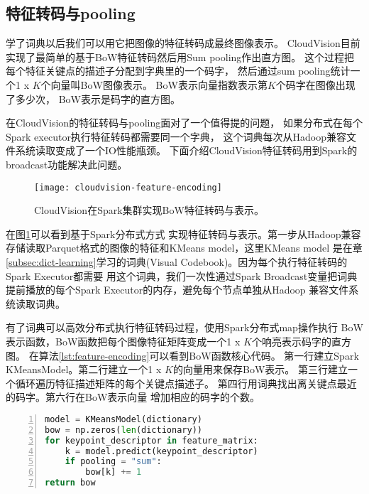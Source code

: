 \subsection{特征转码与pooling}
\label{subsec:feature-encoding}
学了词典以后我们可以用它把图像的特征转码成最终图像表示。
CloudVision目前实现了最简单的基于BoW特征转码然后用Sum pooling作出直方图。
这个过程把每个特征关键点的描述子分配到字典里的一个码字，
然后通过sum pooling统计一个1 x $K$个向量叫BoW图像表示。
BoW表示向量指数表示第$K$个码字在图像出现了多少次，
BoW表示是码字的直方图。

在CloudVision的特征转码与pooling面对了一个值得提的问题，
如果分布式在每个Spark executor执行特征转码都需要同一个字典，
这个词典每次从Hadoop兼容文件系统读取变成了一个IO性能瓶颈。
下面介绍CloudVision特征转码用到Spark的broadcast功能解决此问题。


\begin{figure}[h]
  \centering
    \texttt{[image: cloudvision-feature-encoding]}
  \caption{CloudVision在Spark集群实现BoW特征转码与表示。}
  \label{fig:cloudvision-feature-encoding}
\end{figure}
在图\ref{fig:cloudvision-feature-encoding}可以看到基于Spark分布式方式
实现特征转码与表示。第一步从Hadoop兼容存储读取Parquet格式的图像的特征和KMeans model，这里KMeans model
是在章\ref{subsec:dict-learning}学习的词典(Visual Codebook)。因为每个执行特征转码的Spark Executor都需要
用这个词典，我们一次性通过Spark Broadcast变量把词典提前播放的每个Spark Executor的内存，避免每个节点单独从Hadoop
兼容文件系统读取词典。\cite{spark-programming-guide}

有了词典可以高效分布式执行特征转码过程，使用Spark分布式map操作执行
BoW表示函数，BoW函数把每个图像特征矩阵变成一个1 x $K$个响亮表示码字的直方图。
在算法\ref{lst:feature-encoding}可以看到BoW函数核心代码。
第一行建立Spark KMeansModel。第二行建立一个1 x $K$的向量用来保存BoW表示。
第三行建立一个循环遍历特征描述矩阵的每个关键点描述子。
第四行用词典找出离关键点最近的码字。第六行在BoW表示向量
增加相应的码字的个数。
\begin{lstlisting}[language=Python,
                   basicstyle=\small,
                   numbers=left,
                   showstringspaces=false,
                   caption={BoW特征转码核心代码},
                   label={lst:feature-encoding}]
model = KMeansModel(dictionary)
bow = np.zeros(len(dictionary))
for keypoint_descriptor in feature_matrix:
    k = model.predict(keypoint_descriptor)
    if pooling = "sum":
        bow[k] += 1
return bow
\end{lstlisting}

